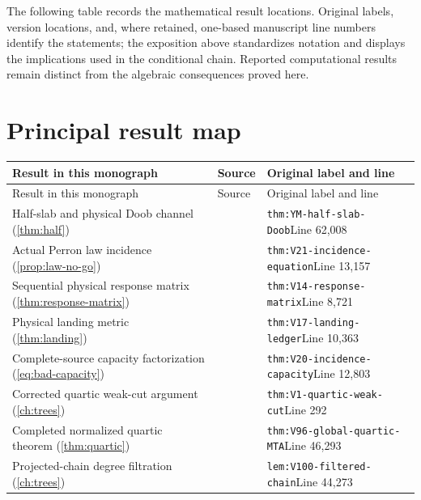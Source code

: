 \documentclass[11pt,oneside,openany]{book}
\theoremstyle{definition}
\theoremstyle{remark}
\begin{document}
The following table records the mathematical result locations. Original
labels, version locations, and, where retained, one-based manuscript
line numbers identify the statements;
the exposition above standardizes notation and displays the implications
used in the conditional chain. Reported computational results remain
distinct from the algebraic consequences proved here.

\section{Principal result map}
\small
\begin{longtable}{L{0.32\textwidth}L{0.12\textwidth}L{0.477\textwidth}}
\toprule Result in this monograph & Source & Original label and line \\ \midrule
\endfirsthead
\toprule Result in this monograph & Source & Original label and line \\ \midrule
\endhead
Half-slab and physical Doob channel (\cref{thm:half}) & \cite{GT} & \nolinkurl{thm:YM-half-slab-Doob}\newline Line 62,008 \\
Actual Perron law incidence (\cref{prop:law-no-go}) & \cite{F1} & \nolinkurl{thm:V21-incidence-equation}\newline Line 13,157 \\
Sequential physical response matrix (\cref{thm:response-matrix}) & \cite{F1} & \nolinkurl{thm:V14-response-matrix}\newline Line 8,721 \\
Physical landing metric (\cref{thm:landing}) & \cite{F1} & \nolinkurl{thm:V17-landing-ledger}\newline Line 10,363 \\
Complete-source capacity factorization (\cref{eq:bad-capacity}) & \cite{F1} & \nolinkurl{thm:V20-incidence-capacity}\newline Line 12,803 \\
Corrected quartic weak-cut argument (\cref{ch:trees}) & \cite{F2} & \nolinkurl{thm:V1-quartic-weak-cut}\newline Line 292 \\
Completed normalized quartic theorem (\cref{thm:quartic}) & \cite{F3} & \nolinkurl{thm:V96-global-quartic-MTA}\newline Line 46,293 \\
Projected-chain degree filtration (\cref{ch:trees}) & \cite{F4} & \nolinkurl{lem:V100-filtered-chain}\newline Line 44,273 \\

\end{longtable}
\end{document}
